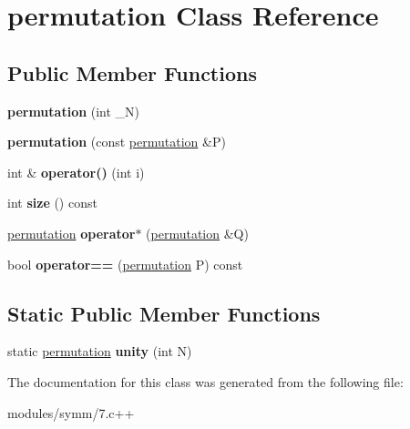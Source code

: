 \hypertarget{classpermutation}{\section{permutation Class Reference}
\label{classpermutation}
}
\subsection*{Public Member Functions}
\begin{DoxyCompactItemize}
\item 
\hypertarget{classpermutation_a823970aa2577c5ef4c3b03d7553360ac}{{\bfseries permutation} (int \-\_\-\-N)}\label{classpermutation_a823970aa2577c5ef4c3b03d7553360ac}

\item 
\hypertarget{classpermutation_a089ce3fbe24baaadbab169b2034244c5}{{\bfseries permutation} (const \hyperlink{classpermutation}{permutation} \&P)}\label{classpermutation_a089ce3fbe24baaadbab169b2034244c5}

\item 
\hypertarget{classpermutation_a45533397fb9ceb915317739e023f6590}{int \& {\bfseries operator()} (int i)}\label{classpermutation_a45533397fb9ceb915317739e023f6590}

\item 
\hypertarget{classpermutation_a2e75a13d8fd772c4c3c355c36729ba91}{int {\bfseries size} () const }\label{classpermutation_a2e75a13d8fd772c4c3c355c36729ba91}

\item 
\hypertarget{classpermutation_a73f1d641cc0058be21c8db6cb128289c}{\hyperlink{classpermutation}{permutation} {\bfseries operator$\ast$} (\hyperlink{classpermutation}{permutation} \&Q)}\label{classpermutation_a73f1d641cc0058be21c8db6cb128289c}

\item 
\hypertarget{classpermutation_a3278bb96f72cc86f63f4dc7c69ffa335}{bool {\bfseries operator==} (\hyperlink{classpermutation}{permutation} P) const }\label{classpermutation_a3278bb96f72cc86f63f4dc7c69ffa335}

\end{DoxyCompactItemize}
\subsection*{Static Public Member Functions}
\begin{DoxyCompactItemize}
\item 
\hypertarget{classpermutation_a649343a3cde666ef55f8acb54f965fff}{static \hyperlink{classpermutation}{permutation} {\bfseries unity} (int N)}\label{classpermutation_a649343a3cde666ef55f8acb54f965fff}

\end{DoxyCompactItemize}


The documentation for this class was generated from the following file\-:\begin{DoxyCompactItemize}
\item 
modules/symm/7.\-c++\end{DoxyCompactItemize}
